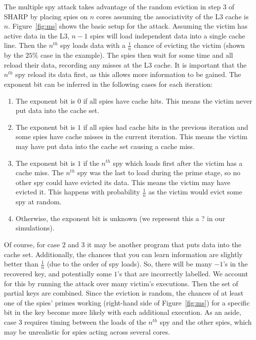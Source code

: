 \documentclass[12pt]{article}
\begin{document}
The multiple spy attack takes advantage of the random eviction in step $3$ of SHARP by placing spies on $n$ cores assuming the associativity of the L3 cache is $n$.
Figure~\ref{fig:ms} shows the basic setup for the attack.
Assuming the victim has active data in the L3, $n-1$ spies will load independent data into a single cache line.
Then the $n^{th}$ spy loads data with a $\frac{1}{n}$ chance of evicting the victim (shown by the $25\%$ case in the example).
The spies then wait for some time and all reload their data, recording any misses at the L3 cache.
It is important that the $n^{th}$ spy reload its data first, as this allows more information to be gained.
The exponent bit can be inferred in the following cases for each iteration:

\begin{enumerate}

\item The exponent bit is $0$ if all spies have cache hits. This means the victim never put data into the cache set.
\item The exponent bit is $1$ if all spies had cache hits in the previous iteration and some spies have cache misses in the current iteration. This means the victim may have put data into the cache set causing a cache miss.
\item The exponent bit is $1$ if the $n^{th}$ spy which loads first after the victim has a cache miss. The $n^{th}$ spy was the last to load during the prime stage, so no other spy could have evicted its data. This means the victim may have evicted it. This happens with probability $\frac{1}{n}$ as the victim would evict some spy at random.
\item Otherwise, the exponent bit is unknown (we represent this a ? in our simulations).

\end{enumerate}

Of course, for case $2$ and $3$ it may be another program that puts data into the cache set.
Additionally, the chances that you can learn information are slightly better than $\frac{1}{n}$ (due to the order of spy loads).
So, there will be many $-1$'s in the recovered key, and potentially some $1$'s that are incorrectly labelled. 
We account for this by running the attack over many victim's executions.
Then the set of partial keys are combined.
Since the eviction is random, the chances of at least one of the spies' primes working (right-hand side of Figure~\ref{fig:ms}) for a specific bit in the key become more likely with each additional execution.
As an aside, case $3$ requires timing between the loads of the $n^{th}$ spy and the other spies, which may be unrealistic for spies acting across several cores.
\end{document}
